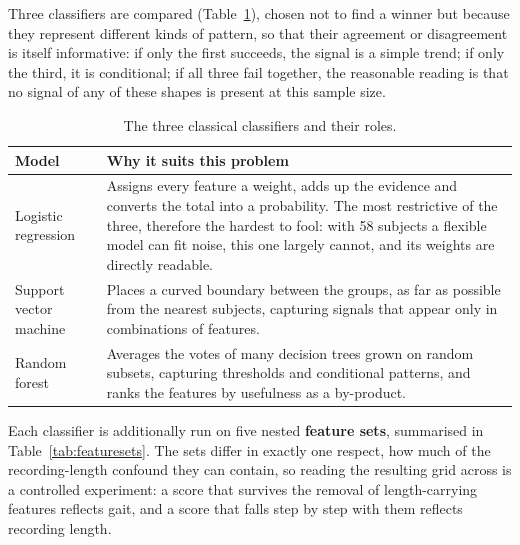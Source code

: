 Three classifiers are compared (Table~\ref{tab:classifiers}), chosen not to
find a winner but because they represent different kinds of pattern, so that
their agreement or disagreement is itself informative: if only the first
succeeds, the signal is a simple trend; if only the third, it is conditional;
if all three fail together, the reasonable reading is that no signal of any of
these shapes is present at this sample size.

\begin{table}[H]
  \centering
  \caption[The three classical classifiers and their roles]{The three classical classifiers and their roles.}
  \label{tab:classifiers}
  \small
  \begin{tabular}{@{}lp{10.2cm}@{}}
    \toprule
    Model & Why it suits this problem \\
    \midrule
    Logistic regression &
      Assigns every feature a weight, adds up the evidence and converts the
      total into a probability. The most restrictive of the three, therefore
      the hardest to fool: with 58 subjects a flexible model can fit noise,
      this one largely cannot, and its weights are directly readable. \\
    \addlinespace
    Support vector machine &
      Places a curved boundary between the groups, as far as possible from
      the nearest subjects, capturing signals that appear only in
      combinations of features. \\
    \addlinespace
    Random forest &
      Averages the votes of many decision trees grown on random subsets,
      capturing thresholds and conditional patterns, and ranks the features
      by usefulness as a by-product. \\
    \bottomrule
  \end{tabular}
\end{table}

Each classifier is additionally run on five nested \textbf{feature sets},
summarised in Table~\ref{tab:featuresets}. The sets differ in exactly one
respect, how much of the recording-length confound they can contain, so
reading the resulting grid across is a controlled experiment: a score that
survives the removal of length-carrying features reflects gait, and a score
that falls step by step with them reflects recording length.

